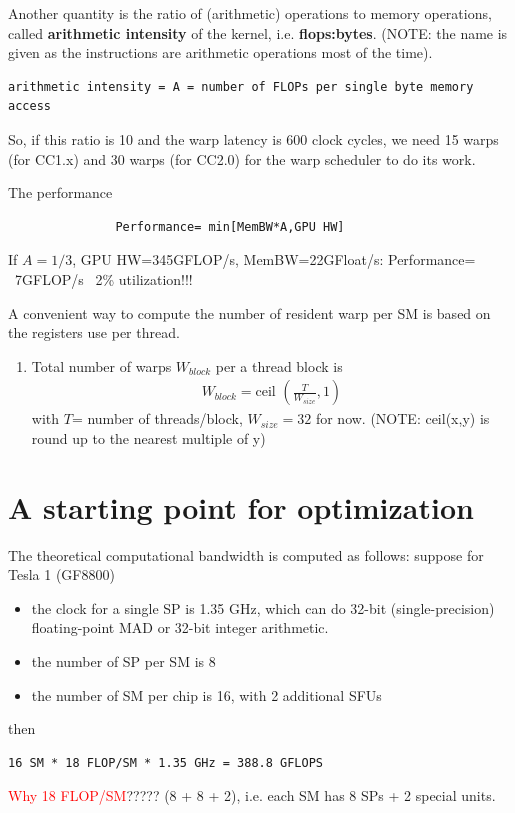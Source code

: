 Another quantity is the ratio of (arithmetic) operations to memory
operations, called {\bf arithmetic intensity} of the kernel, i.e.
{\bf flops:bytes}.  (NOTE: the name is given as the instructions are
arithmetic operations most of the time).
\begin{verbatim}
arithmetic intensity = A = number of FLOPs per single byte memory access
\end{verbatim}
So, if this ratio is 10 and the warp latency is 600 clock cycles, we
need 15 warps (for CC1.x) and 30 warps (for CC2.0) for the warp
scheduler to do its work.

\begin{framed}
  The performance
\begin{verbatim}
               Performance= min[MemBW*A,GPU HW]
\end{verbatim}
  If $A = 1/3$, GPU HW=345GFLOP/s, MemBW=22GFloat/s: Performance=
  ~7GFLOP/s ~2\% utilization!!!
\end{framed}

A convenient way to compute the number of resident warp per SM is
based on the registers use per thread.
\begin{enumerate}
\item Total number of warps $W_{block}$ per a thread block is
  \begin{eqnarray}
    \label{eq:93}
    W_{block} = \text{ceil } \left(\frac{T}{W_{size}},1\right)
  \end{eqnarray}
  with $T$= number of threads/block, $W_{size}=32$ for now. (NOTE:
  ceil(x,y) is round up to the nearest multiple of y)
\end{enumerate}



\section{A starting point for optimization}
\label{sec:start-point-optim}

The theoretical computational bandwidth is computed as follows:
suppose for Tesla 1 (GF8800)
\begin{itemize}
\item the clock for a single SP is 1.35 GHz, which can do 32-bit
  (single-precision) floating-point MAD or 32-bit integer arithmetic.
\item the number of SP per SM is 8 
\item the number of SM per chip is 16, with 2 additional SFUs
\end{itemize}
then 
\begin{verbatim}
16 SM * 18 FLOP/SM * 1.35 GHz = 388.8 GFLOPS
\end{verbatim}
\textcolor{red}{Why 18 FLOP/SM}????? (8 + 8 + 2), i.e. each SM has 8
SPs + 2 special units. 

